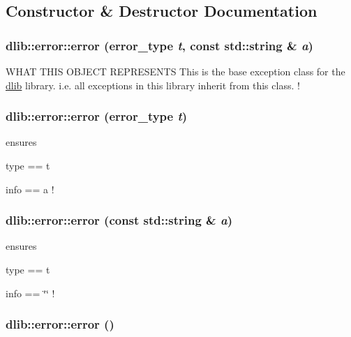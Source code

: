 \subsection{Constructor \& Destructor Documentation}
\hypertarget{classdlib_1_1error_a9bf6adbf16ad50c6a509b4e18d6becaa}{
\subsubsection[{error}]{\setlength{\rightskip}{0pt plus 5cm}dlib::error::error (error\_\-type {\em t}, \/  const std::string \& {\em a})}}
\label{classdlib_1_1error_a9bf6adbf16ad50c6a509b4e18d6becaa}
WHAT THIS OBJECT REPRESENTS This is the base exception class for the \hyperlink{namespacedlib}{dlib} library. i.e. all exceptions in this library inherit from this class. ! \hypertarget{classdlib_1_1error_aef92e7c614783f7a1290b8430dc3bea8}{
\subsubsection[{error}]{\setlength{\rightskip}{0pt plus 5cm}dlib::error::error (error\_\-type {\em t})}}
\label{classdlib_1_1error_aef92e7c614783f7a1290b8430dc3bea8}
ensures
\begin{DoxyItemize}
\item type == t
\item info == a ! 
\end{DoxyItemize}\hypertarget{classdlib_1_1error_a05e6b9e17d00751f4603b9b19774fcc0}{
\subsubsection[{error}]{\setlength{\rightskip}{0pt plus 5cm}dlib::error::error (const std::string \& {\em a})}}
\label{classdlib_1_1error_a05e6b9e17d00751f4603b9b19774fcc0}
ensures
\begin{DoxyItemize}
\item type == t
\item info == \char`\"{}\char`\"{} ! 
\end{DoxyItemize}\hypertarget{classdlib_1_1error_a7aa811457dae46c97d8b9ecc696b0559}{
\subsubsection[{error}]{\setlength{\rightskip}{0pt plus 5cm}dlib::error::error ()}}
